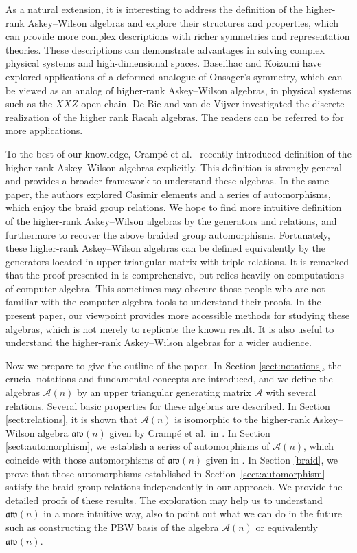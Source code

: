 \documentclass[pdftex]{sigma}
\numberwithin{equation}{section}
\def\A{\mathscr{A}}
\def\aw{\mathfrak{aw}}
\begin{document}
As a natural extension, it is interesting to address the definition of the higher-rank
Askey--Wilson algebras and explore their structures and properties, which can provide more complex descriptions with richer symmetries and representation theories.
These descriptions can demonstrate advantages in solving complex physical systems and high-dimensional spaces.
Baseilhac and Koizumi \cite{BK(2005)} have explored applications of a deformed analogue of Onsager's symmetry,
which can be viewed as an analog of higher-rank Askey--Wilson algebras, in physical systems such as the $XXZ$ open chain.
De Bie and van de Vijver \cite{DV(2020)} investigated the discrete realization of the higher rank Racah algebras.
The readers can be referred to \cite{CL(2022),DDV(2020),De(2019),PW(2017)} for more applications.

To the best of our knowledge, Cramp\'{e} et al.\ \cite{CFPR(2023)} recently introduced definition of the higher-rank Askey--Wilson algebras explicitly.
This definition is strongly general and provides a broader framework to understand these algebras.
In the same paper, the authors explored Casimir elements and a series of automorphisms, which enjoy the braid group relations.
We hope to find more intuitive definition of the higher-rank Askey--Wilson algebras by the generators and relations, and furthermore to recover the above braided group automorphisms.
Fortunately, these higher-rank Askey--Wilson algebras can be defined equivalently by the generators located in upper-triangular matrix with triple relations.
It is remarked that the proof presented in \cite{CFPR(2023)} is comprehensive, but relies heavily on computations of computer algebra. This sometimes may obscure those people who are not familiar with the computer algebra tools to understand their proofs.
In the present paper, our viewpoint provides more accessible methods for studying these algebras, which is not merely to replicate the known result.
It is also useful to understand the higher-rank Askey--Wilson algebras for a wider audience.

Now we prepare to give the outline of the paper.
In Section \ref{sect:notations}, the crucial notations and fundamental concepts are introduced, and we define the algebras $\A(n)$ by an upper triangular generating matrix $\A$ with several relations.
Several basic properties for these algebras are described.
In Section \ref{sect:relations}, it is shown that $\A(n)$ is isomorphic to the higher-rank Askey--Wilson algebra $\aw(n)$ given by Cramp\'{e} et al.\ in \cite{CFPR(2023)}.
In Section \ref{sect:automorphism}, we establish a series of automorphisms of $\A(n)$, which coincide with those automorphisms of $\aw(n)$ given in \cite{CFPR(2023)}.
In Section \ref{braid}, we prove that those automorphisms established in Section~\ref{sect:automorphism} satisfy the braid group relations independently in our approach.
We provide the detailed proofs of these results.
The exploration may help us to understand $\aw(n)$ in a more intuitive way, also to point out what we can do in the future such as constructing the PBW basis of the algebra $\A(n)$ or equivalently $\aw(n)$.
\end{document}
